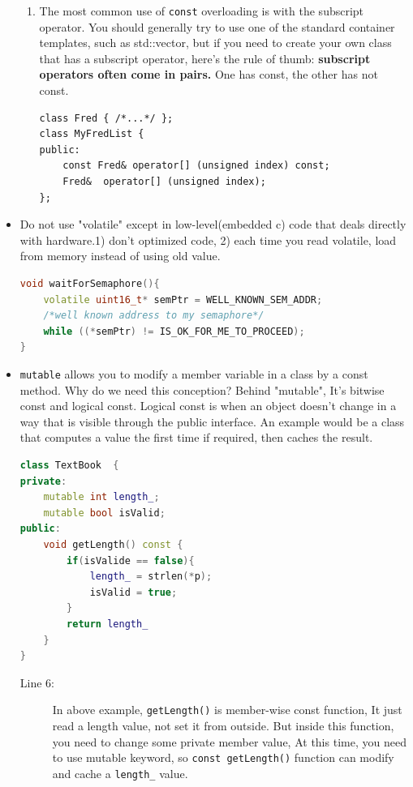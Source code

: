 \documentclass[a4paper,11pt,twoside]{book}
\begin{document}
\begin{itemize}
\begin{enumerate}
		\item The most common use of \texttt{const} overloading is with the subscript operator. You should generally try to use one of the standard container templates, such as std::vector, but if you need to create your own class that has a subscript operator, here's the rule of thumb:\textbf{ subscript operators often come in pairs.} One has const, the other has not const. 
\begin{lstlisting}[numbers=none]
class Fred { /*...*/ };
class MyFredList {
public:
	const Fred& operator[] (unsigned index) const;
	Fred&  operator[] (unsigned index);
};
\end{lstlisting}
		
	\end{enumerate}
	

	
	\item Do not use "volatile" except in low-level(embedded c) code that deals directly with hardware.1) don't optimized code, 2) each time you read volatile, load from memory instead of using old value.
\begin{lstlisting}[frame=single, language=c++]
void waitForSemaphore(){
	volatile uint16_t* semPtr = WELL_KNOWN_SEM_ADDR;
	/*well known address to my semaphore*/
	while ((*semPtr) != IS_OK_FOR_ME_TO_PROCEED);
}
\end{lstlisting}
	
	\item \texttt{mutable} allows you to modify a member variable in a class by a const method. Why do we need this conception? Behind "mutable", It's bitwise const and logical const. Logical const is when an object doesn't change in a way that is visible through the public interface. An example would be a class that computes a value the first time if required, then caches the result.
\begin{lstlisting}[frame=single, language=c++]
class TextBook  {
private:
	mutable int length_;
	mutable bool isValid;
public:
	void getLength() const {
		if(isValide == false){
			length_ = strlen(*p);
			isValid = true; 
		}
		return length_
	}
}
\end{lstlisting}
\begin{description}
	\item[Line 6:] In above example, \texttt{getLength()} is member-wise const function, It just read a length value, not set it from outside. But inside this function, you need to change some private member value, At this time, you need to use mutable keyword, so \texttt{const getLength()} function can modify and cache a \texttt{length\_} value.
	

\end{description}
\end{itemize}
\end{document}
